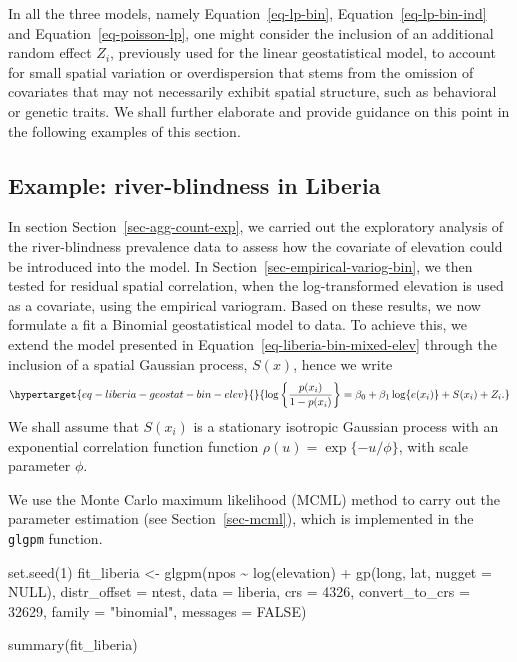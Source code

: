 \documentclass[
  letterpaper,
]{krantz}
\newenvironment{Shaded}{\begin{snugshade}}{\end{snugshade}}
\newcommand{\AttributeTok}[1]{\textcolor[rgb]{0.40,0.45,0.13}{#1}}
\newcommand{\ConstantTok}[1]{\textcolor[rgb]{0.56,0.35,0.01}{#1}}
\newcommand{\DecValTok}[1]{\textcolor[rgb]{0.68,0.00,0.00}{#1}}
\newcommand{\FunctionTok}[1]{\textcolor[rgb]{0.28,0.35,0.67}{#1}}
\newcommand{\NormalTok}[1]{\textcolor[rgb]{0.00,0.23,0.31}{#1}}
\newcommand{\OtherTok}[1]{\textcolor[rgb]{0.00,0.23,0.31}{#1}}
\newcommand{\SpecialCharTok}[1]{\textcolor[rgb]{0.37,0.37,0.37}{#1}}
\newcommand{\StringTok}[1]{\textcolor[rgb]{0.13,0.47,0.30}{#1}}
\begin{document}
In all the three models, namely Equation~\ref{eq-lp-bin},
Equation~\ref{eq-lp-bin-ind} and Equation~\ref{eq-poisson-lp}, one might
consider the inclusion of an additional random effect \(Z_i\),
previously used for the linear geostatistical model, to account for
small spatial variation or overdispersion that stems from the omission
of covariates that may not necessarily exhibit spatial structure, such
as behavioral or genetic traits. We shall further elaborate and provide
guidance on this point in the following examples of this section.

\hypertarget{sec-liberia-estim1}{%
\subsection{Example: river-blindness in
Liberia}\label{sec-liberia-estim1}}

In section Section~\ref{sec-agg-count-exp}, we carried out the
exploratory analysis of the river-blindness prevalence data to assess
how the covariate of elevation could be introduced into the model. In
Section~\ref{sec-empirical-variog-bin}, we then tested for residual
spatial correlation, when the log-transformed elevation is used as a
covariate, using the empirical variogram. Based on these results, we now
formulate a fit a Binomial geostatistical model to data. To achieve
this, we extend the model presented in
Equation~\ref{eq-liberia-bin-mixed-elev} through the inclusion of a
spatial Gaussian process, \(S(x)\), hence we write
\begin{equation}\protect\hypertarget{eq-liberia-geostat-bin-elev}{}{
\log\left\{\frac{p(x_i)}{1-p(x_i)}\right\} = \beta_{0} + \beta_{1}\log\{e(x_i)\} + S(x_i) + Z_i.
}\label{eq-liberia-geostat-bin-elev}\end{equation} We shall assume that
\(S(x_i)\) is a stationary isotropic Gaussian process with an
exponential correlation function function \(\rho(u) = \exp\{-u/\phi\}\),
with scale parameter \(\phi\).

We use the Monte Carlo maximum likelihood (MCML) method to carry out the
parameter estimation (see Section~\ref{sec-mcml}), which is implemented
in the \texttt{glgpm} function.

\begin{Shaded}
\begin{Highlighting}[]
\FunctionTok{set.seed}\NormalTok{(}\DecValTok{1}\NormalTok{)}
\NormalTok{fit\_liberia }\OtherTok{\textless{}{-}} 
\FunctionTok{glgpm}\NormalTok{(npos }\SpecialCharTok{\textasciitilde{}} \FunctionTok{log}\NormalTok{(elevation) }\SpecialCharTok{+} \FunctionTok{gp}\NormalTok{(long, lat, }\AttributeTok{nugget =} \ConstantTok{NULL}\NormalTok{),}
      \AttributeTok{distr\_offset =}\NormalTok{ ntest, }\AttributeTok{data =}\NormalTok{ liberia,}
      \AttributeTok{crs =} \DecValTok{4326}\NormalTok{,}
      \AttributeTok{convert\_to\_crs =} \DecValTok{32629}\NormalTok{,}
      \AttributeTok{family =} \StringTok{"binomial"}\NormalTok{, }\AttributeTok{messages =} \ConstantTok{FALSE}\NormalTok{)}

\FunctionTok{summary}\NormalTok{(fit\_liberia)}
\end{Highlighting}
\end{Shaded}
\end{document}
